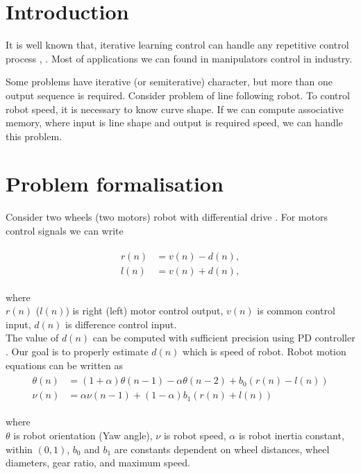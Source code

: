 \documentclass[twoside]{oss-conf-eng}
\begin{document}

\section*{Introduction}

It is well known that, iterative learning control can handle any repetitive control
process \cite{ilc1}, \cite{ilc2}. Most of applications we can found in manipulators
control in industry.

Some problems have iterative (or semiterative) character, but more than one
output sequence is required. Consider problem of line following robot. To control robot
speed, it is necessary to know curve shape. If we can compute associative memory, where input is
line shape and output is required speed, we can handle this problem.

\section{Problem formalisation}

Consider two wheels (two motors) robot with differential drive \cite{robot_model_1}. For motors
control signals we can write

\begin{eqnarray}
\begin{split}
\label{robot_equation}
	r(n) &=	v(n) - d(n), \\
    l(n) &=	v(n) + d(n),
\end{split}
\end{eqnarray}

where \\
$r(n)$ ($l(n)$) is right (left) motor control output,
$v(n)$ is common control input,
$d(n)$ is difference control input.
\\
The value of $d(n)$ can be computed with sufficient precision using PD controller \cite{servo_pd}. Our goal
is to properly estimate $d(n)$ which is speed of robot.
Robot motion equations can be written as
\begin{eqnarray}
\begin{split}
\label{robot_equation}
	\theta(n) &= (1 + \alpha) \theta(n-1) - \alpha \theta(n-2) + b_0 (r(n) - l(n))  \\
    \nu(n) &=  \alpha \nu(n-1) + (1 - \alpha) b_1 (r(n) + l(n))
\end{split}
\end{eqnarray}

where \\
$\theta$ is robot orientation (Yaw angle),
$\nu$ is robot speed,
$\alpha$ is robot inertia constant, within $(0, 1)$,
$b_0$ and $b_1$ are constants dependent on wheel distances, wheel diameters, gear ratio, and
maximum speed.
\end{document}
